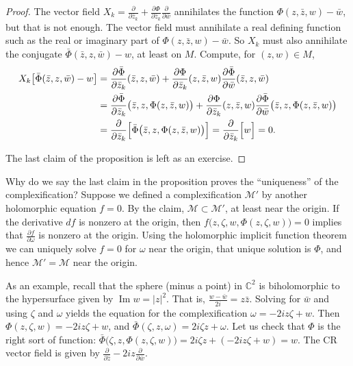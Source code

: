 \documentclass[12pt,openany]{book}
\renewcommand{\Im}{\operatorname{Im}}
\newcommand{\sabs}[1]{\lvert {#1} \rvert}
\newcommand{\C}{{\mathbb{C}}}
\newcommand{\sM}{{\mathscr{M}}}
\theoremstyle{plain}
\theoremstyle{remark}
\theoremstyle{definition}
\theoremstyle{exercise}
\theoremstyle{example}
\begin{document}
\begin{proof}
The vector field
$X_k = \frac{\partial}{\partial \bar{z}_k}
+\frac{\partial \Phi}{\partial \bar{z}_k} \frac{\partial}{\partial \bar{w}}$
annihilates
the function $\Phi(z,\bar{z},w)-\bar{w}$, but that is not enough.
The vector field must annihilate a real defining function such as the
real or imaginary part of $\Phi(z,\bar{z},w)-\bar{w}$.  So $X_k$ must also
annihilate the conjugate
$\bar{\Phi}(\bar{z},z,\bar{w})-w$, at least on $M$.  Compute, for $(z,w) \in M$,
\begin{equation*}
\begin{split}
X_k \bigl[\bar{\Phi}(\bar{z},z,\bar{w})-w\bigr]
&=
\frac{\partial \bar{\Phi}}{\partial \bar{z}_k}
{(\bar{z},z,\bar{w})}
+
\frac{\partial \Phi}{\partial \bar{z}_k}
{(z,\bar{z},w)}
\frac{\partial \bar{\Phi}}{\partial \bar{w}}
{(\bar{z},z,\bar{w})}
\\
& =
\frac{\partial \bar{\Phi}}{\partial \bar{z}_k}
{\bigl(\bar{z},z,\Phi(z,\bar{z},w)\bigr)}
+
\frac{\partial \Phi}{\partial \bar{z}_k}
{(z,\bar{z},w)}
\frac{\partial \bar{\Phi}}{\partial \bar{w}}
{\bigl(\bar{z},z,\Phi(z,\bar{z},w)\bigr)}
\\
& =
\frac{\partial}{\partial \bar{z}_k}
\Bigl[
\bar{\Phi}\bigl(\bar{z},z,\Phi(z,\bar{z},w)\bigr)
\Bigr]
=
\frac{\partial}{\partial \bar{z}_k}
\Bigl[
w
\Bigr]
= 0 .
\end{split}
\end{equation*}

The last claim of the proposition is left as an exercise.
\end{proof}

Why do we say the last claim in the proposition
proves the ``uniqueness'' of the complexification?
Suppose we defined a complexification $\sM'$ by another holomorphic
equation $f=0$.
By the claim, $\sM \subset \sM'$, at least near the origin.
If the derivative $df$ is nonzero at the origin, then
$f\bigl(z,\zeta,w,\Phi(z,\zeta,w)\bigr) = 0$ implies that
$\frac{\partial f}{\partial \omega}$ is nonzero at the origin.
Using the holomorphic implicit function theorem we can uniquely solve $f=0$
for $\omega$ near the origin, that unique solution is $\Phi$,
and hence $\sM' = \sM$ near the origin.

As an example, recall that the sphere (minus a point) in $\C^2$ is biholomorphic to the
hypersurface
given by $\Im w = \sabs{z}^2$.  That is, $\frac{w-\bar{w}}{2i} = z \bar{z}$.
Solving for
$\bar{w}$ and using $\zeta$ and $\omega$ yields the equation for the
complexification $\omega = -2iz \zeta + w$.
Then $\Phi(z,\zeta,w) = -2iz \zeta + w$, and
$\bar{\Phi}(\zeta,z,\omega) = 2i\zeta z + \omega$.
Let us check that $\Phi$ is the right sort of function:
$\bar{\Phi}\bigl(\zeta,z,\Phi(z,\zeta,w)\bigr)
=
2i\zeta z + (-2i z \zeta + w) = w$.  The CR vector field is
given by
$\frac{\partial}{\partial \bar{z}}
-2i z \frac{\partial}{\partial \bar{w}}$.
\end{document}
